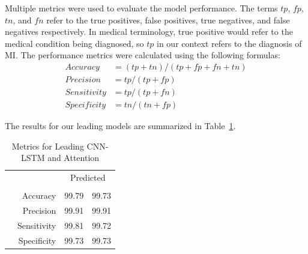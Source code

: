 \documentclass{ieeeaccess}
\begin{document}
Multiple metrics were used to evaluate the model performance. The terms $tp$, $fp$, $tn$, and $fn$ refer to the true positives, false positives, true negatives, and false negatives respectively. In medical terminology, true positive would refer to the medical condition being diagnosed, so $tp$ in our context refers to the diagnosis of MI. The performance metrics were calculated using the following formulas:
\begin{align*} 
Accuracy    &=(tp + tn)/(tp + fp + fn + tn)   \\
Precision   &=tp/(tp + fp)                   \\
Sensitivity &=tp/(tp + fn)               \\
Specificity &=tn/(tn + fp)    
\end{align*}

 
The results for our leading models are summarized in Table~\ref{tbl:kpis}.
\begin{table}[!ht]
\caption{Metrics for Leading CNN-LSTM and Attention}
\label{tbl:kpis}
\centering
\scriptsize
{%
	\renewcommand{\arraystretch}{1.5}
	\begin{tabular}{cr|r r}
		\multicolumn{2}{c|}{}
		&   \multicolumn{2}{c}{Predicted}\\
		&	&\multicolumn{1}{c}{\rotatebox{90}{CNN-LSTM}} &\multicolumn{1}{c}{\rotatebox{90}{ ATTENTION}}\\
		\cline{2-4}
		\multirow{2}{*}{\rotatebox[origin=c]{90}{Actual}}
		& Accuracy 	    &99.79	    &	99.73\\	
		& Precision 	&99.91	    &	99.91\\	
		& Sensitivity 	&99.81	    &	99.72\\	
		& Specificity 	&99.73	    &	99.73\\	
	\end{tabular}
\medskip	
}
\end{table}
\end{document}
